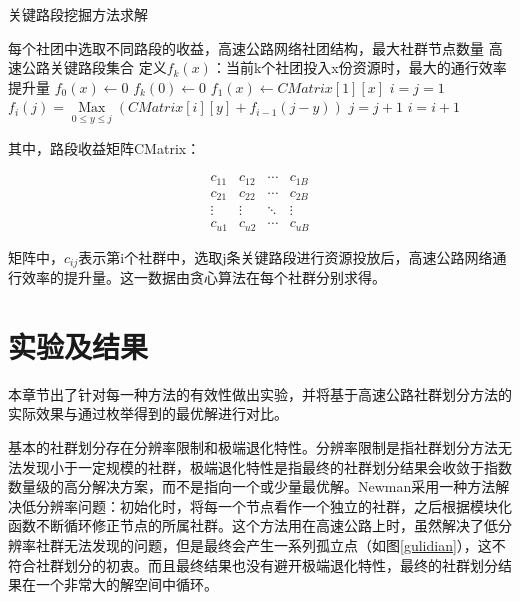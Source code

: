 				\begin{algorithm}[h]
		        \caption{关键路段挖掘方法求解}  
		        \label{touzi}
		        \begin{algorithmic}[1] %
		            \Require 每个社团中选取不同路段的收益，高速公路网络社团结构，最大社群节点数量
		            \Ensure 高速公路关键路段集合
		                \State 定义$f_k (x)$：当前k个社团投入x份资源时，最大的通行效率提升量
		                \State $f_0 (x)\gets 0$
		                \State $f_k (0)\gets 0$
		                \State $f_1 (x)\gets CMatrix[1][x]$
		                \State $i=j=1$
		                		\State $f_i (j)=\mathop {{\text{Max}}}\limits_{0 \leqslant y \leqslant j} (CMatrix[i][y]+f_{i-1} (j-y))$
		                		\State $j=j+1$
		                	\EndWhile
		                	\State $i=i+1$
		                \EndWhile  
		                \State {}  
		            \EndFunction  
		        \end{algorithmic}  
		    	\end{algorithm} 

		    	其中，路段收益矩阵CMatrix：

				\[\begin{array}{*{20}{c}}
				  {{c_{11}}}&{{c_{12}}}& \cdots &{{c_{1B}}} \\ 
				  {{c_{21}}}&{{c_{22}}}& \cdots &{{c_{2B}}} \\ 
				   \vdots & \vdots & \ddots & \vdots  \\ 
				  {{c_{u1}}}&{{c_{u2}}}& \cdots &{{c_{uB}}} 
				\end{array}\]
				
				矩阵中，$c_{ij}$表示第i个社群中，选取j条关键路段进行资源投放后，高速公路网络通行效率的提升量。这一数据由贪心算法在每个社群分别求得。

	\section{实验及结果}
		本章节出了针对每一种方法的有效性做出实验，并将基于高速公路社群划分方法的实际效果与通过枚举得到的最优解进行对比。

		基本的社群划分存在分辨率限制和极端退化特性。分辨率限制是指社群划分方法无法发现小于一定规模的社群，极端退化特性是指最终的社群划分结果会收敛于指数数量级的高分解决方案，而不是指向一个或少量最优解。Newman\parencite{NewmanFast}采用一种方法解决低分辨率问题：初始化时，将每一个节点看作一个独立的社群，之后根据模块化函数不断循环修正节点的所属社群。这个方法用在高速公路上时，虽然解决了低分辨率社群无法发现的问题，但是最终会产生一系列孤立点（如图\ref{gulidian}），这不符合社群划分的初衷。而且最终结果也没有避开极端退化特性，最终的社群划分结果在一个非常大的解空间中循环。

